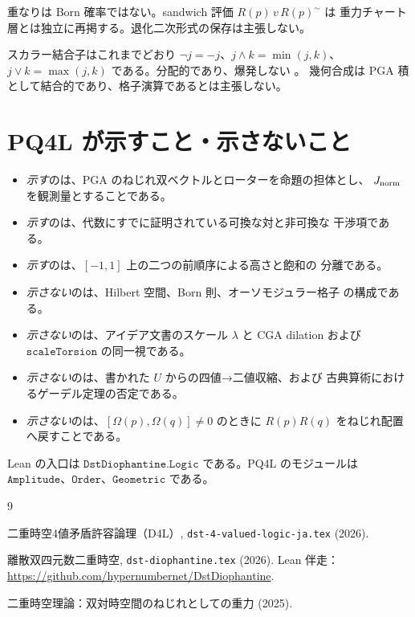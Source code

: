 \documentclass[dvipdfmx,11pt,a4paper]{article}
\theoremstyle{definition}
\theoremstyle{remark}
\newcommand{\Jnorm}{J_{\rm norm}}
\begin{document}
重なりは Born 確率ではない。sandwich 評価 \(R(p)\,v\,R(p)^\sim\) は
重力チャート層とは独立に再掲する。退化二次形式の保存は主張しない。

スカラー結合子はこれまでどおり \(\neg j=-j\)、\(j\wedge k=\min(j,k)\)、
\(j\vee k=\max(j,k)\) である。分配的であり、爆発しない \cite{D4L2026}。
幾何合成は PGA 積として結合的であり、格子演算であるとは主張しない。

\section{PQ4L が示すこと・示さないこと}

\begin{itemize}[leftmargin=1.4em]
  \item \emph{示す}のは、PGA のねじれ双ベクトルとローターを命題の担体とし、
        \(\Jnorm\) を観測量とすることである。
  \item \emph{示す}のは、代数にすでに証明されている可換な対と非可換な
        干渉項である。
  \item \emph{示す}のは、\([-1,1]\) 上の二つの前順序による高さと飽和の
        分離である。
  \item \emph{示さない}のは、Hilbert 空間、Born 則、オーソモジュラー格子
        の構成である。
  \item \emph{示さない}のは、アイデア文書のスケール \(\lambda\) と CGA
        dilation および \(\texttt{scaleTorsion}\) の同一視である。
  \item \emph{示さない}のは、書かれた \(U\) からの四値→二値収縮、および
        古典算術におけるゲーデル定理の否定である。
  \item \emph{示さない}のは、\([\Omega(p),\Omega(q)]\ne 0\) のときに
        \(R(p)R(q)\) をねじれ配置へ戻すことである。
\end{itemize}

Lean の入口は \(\texttt{DstDiophantine.Logic}\) である。PQ4L のモジュールは
\(\texttt{Amplitude}\)、\(\texttt{Order}\)、\(\texttt{Geometric}\) である。

\begin{thebibliography}{9}
\raggedright

二重時空4値矛盾許容論理（D4L）,
\texttt{dst-4-valued-logic-ja.tex} (2026).

離散双四元数二重時空,
\texttt{dst-diophantine.tex} (2026). Lean 伴走：
\url{https://github.com/hypernumbernet/DstDiophantine}.

二重時空理論：双対時空間のねじれとしての重力 (2025).

\end{thebibliography}
\end{document}
